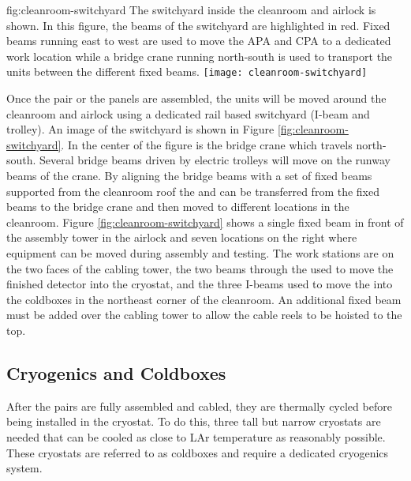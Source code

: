 \begin{dunefigure}{fig:cleanroom-switchyard}
  {The switchyard inside the cleanroom and airlock is shown. In this figure, the beams of the switchyard are highlighted in red. Fixed beams running east to west are used to move the APA and CPA to a dedicated work location while a bridge crane running north-south is used to transport the units between the different fixed beams. }
\texttt{[image: cleanroom-switchyard]}
\end{dunefigure}

Once the  pair or the  panels are assembled, the units will be moved around the cleanroom and airlock using a dedicated rail based switchyard (I-beam and trolley). An image of the switchyard is shown in Figure \ref{fig:cleanroom-switchyard}. In the center of the figure is the bridge crane which travels north-south. Several bridge beams driven by electric trolleys will move on the runway beams of the crane.  By aligning the bridge beams with a set of fixed beams supported from the cleanroom roof the  and  can be transferred from the fixed beams to the bridge crane and then moved to different locations in the cleanroom. Figure \ref{fig:cleanroom-switchyard} shows a single fixed beam in front of the  assembly tower in the airlock and seven locations on the right where equipment can be moved during assembly and testing. The work stations are on the two faces of the  cabling tower, the two beams through the  used to move the finished detector into the cryostat, and the three I-beams used to move the  into the coldboxes in the northeast corner of the cleanroom. An additional fixed beam must be added over the cabling tower to allow the cable reels to be hoisted to the top. 

\subsection{Cryogenics and Coldboxes}
\label{sec:fdsp-tc-infr-cryo}
After the  pairs are fully assembled and cabled, they are thermally cycled before being installed in the cryostat. To do this, three tall but narrow cryostats are needed that can be cooled as close to LAr temperature as reasonably possible. These cryostats are referred to as coldboxes and require a dedicated cryogenics system. 



